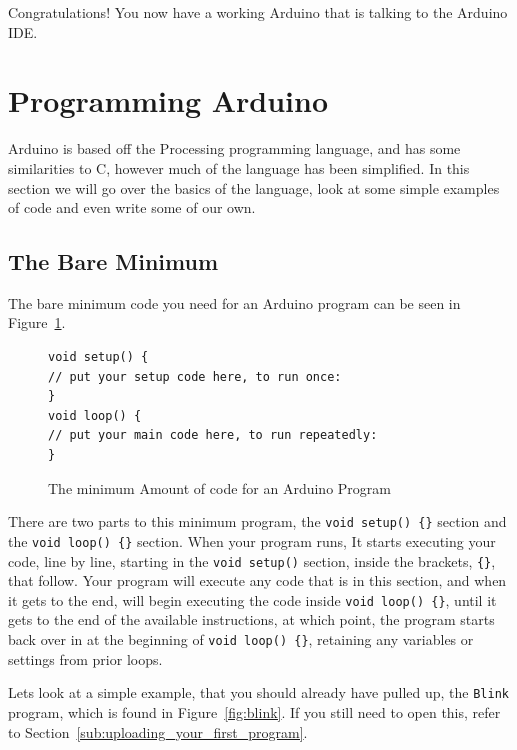 \documentclass[11pt,a4paper]{article}
\begin{document}
Congratulations!  You now have a working Arduino that is talking to the Arduino IDE.



\section{Programming Arduino} %
\label{sec:programming_arduino}

Arduino is based off the Processing\cite{processing} programming language, and has some similarities to C, however much of the language has been simplified.  In this section we will go over the basics of the language, look at some simple examples of code and even write some of our own.

\subsection{The Bare Minimum} %
\label{sub:the_bare_minimum}

The bare minimum code you need for an Arduino program can be seen in Figure~\ref{fig:bare}.

\begin{figure}[htbp]
	\centering
\begin{verbatim}
void setup() {
// put your setup code here, to run once:
}
void loop() {
// put your main code here, to run repeatedly: 
}
\end{verbatim}
	\caption{The minimum Amount of code for an Arduino Program}
	\label{fig:bare}
\end{figure}

There are two parts to this minimum program, the \texttt{void setup() \{\}} section and the \texttt{void loop() \{\}} section.  When your program runs, It starts executing your code, line by line, starting in the \texttt{void setup()} section, inside the brackets, \texttt{\{\}}, that follow.  Your program will execute any code that is in this section, and when it gets to the end, will begin executing the code inside \texttt{void loop() \{\}}, until it gets to the end of the available instructions, at which point, the program starts back over in at the beginning of \texttt{void loop() \{\}}, retaining any variables or settings from prior loops.

Lets look at a simple example, that you should already have pulled up, the \texttt{Blink} program, which is found in Figure~\ref{fig:blink}.  If you still need to open this, refer to Section~\ref{sub:uploading_your_first_program}.
\end{document}
